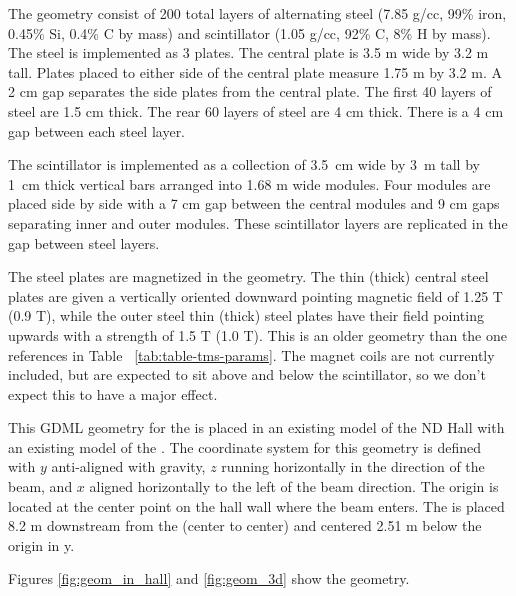 The geometry consist of 200 total layers of alternating steel (7.85 g/cc, 99\% iron, 0.45\% Si, 0.4\% C by mass) and scintillator (1.05 g/cc, 92\% C, 8\% H by mass). The steel is implemented as 3 plates. The central plate is 3.5 m wide by 3.2 m tall. Plates placed to either side of the central plate measure 1.75 m by 3.2 m. A 2 cm gap separates the side plates from the central plate. The first 40 layers of steel are 1.5 cm thick. The rear 60 layers of steel are 4 cm thick. There is a 4 cm gap between each steel layer. 

The scintillator is implemented as a collection of 3.5~cm wide by 3~m tall by 1~cm thick vertical bars arranged into 1.68 m wide modules. Four modules are placed side by side with a 7 cm gap between the central modules and 9 cm gaps separating inner and outer modules. These scintillator layers are replicated in the gap between steel layers.  

The steel plates are magnetized in the geometry. The thin (thick) central steel plates are given a vertically oriented downward pointing magnetic field of 1.25 T (0.9 T), while the outer steel thin (thick) steel plates have their field pointing upwards with a strength of 1.5 T (1.0 T). This is an older geometry than the one references in Table ~\ref{tab:table-tms-params}. The magnet coils are not currently included, but are expected to sit above and below the scintillator, so we don't expect this to have a major effect. 

This GDML geometry for the  is placed in an existing model of the ND Hall with an existing model of the . The coordinate system for this geometry is defined with $y$ anti-aligned with gravity, $z$ running horizontally in the direction of the beam, and $x$ aligned horizontally to the left of the beam direction. The origin is located at the center point on the hall wall where the beam enters. The  is placed 8.2 m downstream from the  (center to center) and centered 2.51 m below the origin in y.   

Figures \ref{fig:geom_in_hall} and \ref{fig:geom_3d} show the geometry.

